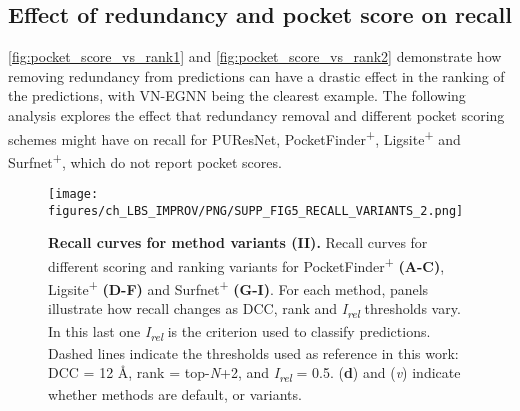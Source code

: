 \FloatBarrier

\subsection{Effect of redundancy and pocket score on recall}

\autoref{fig:pocket_score_vs_rank1} and \autoref{fig:pocket_score_vs_rank2} demonstrate how removing redundancy from predictions can have a drastic effect in the ranking of the predictions, with VN-EGNN being the clearest example. The following analysis explores the effect that redundancy removal and different pocket scoring schemes might have on recall for PUResNet, PocketFinder\textsuperscript{+}, Ligsite\textsuperscript{+} and Surfnet\textsuperscript{+}, which do not report pocket scores.

\begin{figure}[ht!]
    \centering
    \texttt{[image: figures/ch\_LBS\_IMPROV/PNG/SUPP\_FIG5\_RECALL\_VARIANTS\_2.png]}
    \caption[Recall curves for method variants (II)]{\textbf{Recall curves for method variants (II).} Recall curves for different scoring and ranking variants for PocketFinder\textsuperscript{+} \textbf{(A-C)}, Ligsite\textsuperscript{+} \textbf{(D-F)} and Surfnet\textsuperscript{+} \textbf{(G-I)}. For each method, panels illustrate how recall changes as DCC, rank and \textit{I\textsubscript{rel}} thresholds vary. In this last one \textit{I\textsubscript{rel}} is the criterion used to classify predictions. Dashed lines indicate the thresholds used as reference in this work: DCC = 12 \AA{}, rank = top-\textit{N}+2, and \textit{I\textsubscript{rel}} = 0.5. (\textbf{d}) and (\textit{v}) indicate whether methods are default, or variants.}
    \label{fig:pocker_recall_variants2}
\end{figure}

